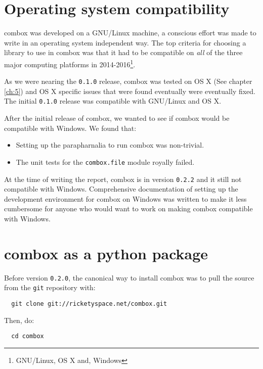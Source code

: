 \section{Operating system compatibility}\label{4-os-compat}

combox was developed on a GNU/Linux machine, a conscious effort was
made to write in an operating system independent way. The top criteria
for choosing a library to use in combox was that it had to be
compatible on \emph{all} of the three major computing platforms in
2014-2016\footnote{GNU/Linux, OS X and, Windows}.

As we were nearing the \verb+0.1.0+ release, combox was tested on OS X
(See chapter \ref{ch:5}) and OS X specific issues that were found
eventually were eventually fixed. The initial \verb+0.1.0+ release was
compatible with GNU/Linux and OS X.

After the initial release of combox, we wanted to see if combox would
be compatible with Windows. We found that:

\begin{itemize}
\item Setting up the parapharnalia to run combox was
  non-trivial\cite{doc:combox-setup-windoze}.
\item The unit tests for the \verb+combox.file+ module royally failed.
\end{itemize}

At the time of writing the report, combox is in version \verb+0.2.2+
and it still not compatible with Windows. Comprehensive documentation
of setting up the development environment for combox on Windows was
written\cite{doc:combox-setup-windoze} to make it less cumbersome for
anyone who would want to work on making combox compatible with
Windows.

\section{combox as a python package}\label{4-pypi}

Before version \verb+0.2.0+, the canonical way to install combox was
to pull the source from the \verb+git+ repository with:

\begin{verbatim}
  git clone git://ricketyspace.net/combox.git
\end{verbatim}

Then, do:

\begin{verbatim}
  cd combox
\end{verbatim}

